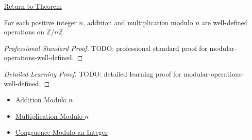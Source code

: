 \newpage
{}
\label{prf:modular-operations-well-defined}

\begin{remark*}[Return]
\hyperref[thm:modular-operations-well-defined]{Return to Theorem}
\end{remark*}

\begin{theorem*}
For each positive integer \(n\), addition and multiplication modulo \(n\) are
well-defined operations on \(\mathbb{Z}/n\mathbb{Z}\).
\end{theorem*}

\begin{proof}[Professional Standard Proof]
\LRAProofBodyStart
TODO: professional standard proof for modular-operations-well-defined.
\end{proof}

\begin{proof}[Detailed Learning Proof]
\LRAProofBodyStart
TODO: detailed learning proof for modular-operations-well-defined.
\end{proof}

\begin{remark*}
\end{remark*}

\begin{dependencies}
\begin{itemize}
\item \hyperref[def:addition-modulo-n]{Addition Modulo \(n\)}
  \item \hyperref[def:multiplication-modulo-n]{Multiplication Modulo \(n\)}
  \item \hyperref[def:congruence-modulo-integer]{Congruence Modulo an Integer}
\end{itemize}
\end{dependencies}

\clearpage
